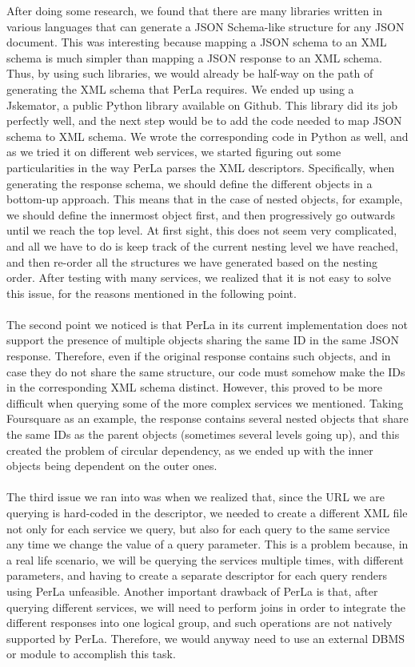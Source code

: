 After doing some research, we found that there are many libraries written in various languages that can generate a JSON Schema-like structure for any JSON document. This was interesting because mapping a JSON schema to an XML schema is much simpler than mapping a JSON response to an XML schema. Thus, by using such libraries, we would already be half-way on the path of generating the XML schema that PerLa requires. We ended up using a Jskemator, a public Python library available on Github. This library did its job perfectly well, and the next step would be to add the code needed to map JSON schema to XML schema. We wrote the corresponding code in Python as well, and as we tried it on different web services, we started figuring out some particularities in the way PerLa parses the XML descriptors. Specifically, when generating the response schema, we should define the different objects in a bottom-up approach. This means that in the case of nested objects, for example, we should define the innermost object first, and then progressively go outwards until we reach the top level. At first sight, this does not seem very complicated, and all we have to do is keep track of the current nesting level we have reached, and then re-order all the structures we have generated based on the nesting order. After testing with many services, we realized that it is not easy to solve this issue, for the reasons mentioned in the following point.\\\\
The second point we noticed is that PerLa in its current implementation does not support the presence of multiple objects sharing the same ID in the same JSON response. Therefore, even if the original response contains such objects, and in case they do not share the same structure, our code must somehow make the IDs in the corresponding XML schema distinct. However, this proved to be more difficult when querying some of the more complex services we mentioned. Taking Foursquare as an example, the response contains several nested objects that share the same IDs as the parent objects (sometimes several levels going up), and this created the problem of circular dependency, as we ended up with the inner objects being dependent on the outer ones.\\\\
The third issue we ran into was when we realized that, since the URL we are querying is hard-coded in the descriptor, we needed to create a different XML file not only for each service we query, but also for each query to the same service any time we change the value of a query parameter. This is a problem because, in a real life scenario, we will be querying the services multiple times, with different parameters, and having to create a separate descriptor for each query renders using PerLa unfeasible. Another important drawback of PerLa is that, after querying different services, we will need to perform joins in order to integrate the different responses into one logical group, and such operations are not natively supported by PerLa. Therefore, we would anyway need to use an external DBMS or module to accomplish this task.\\\\
